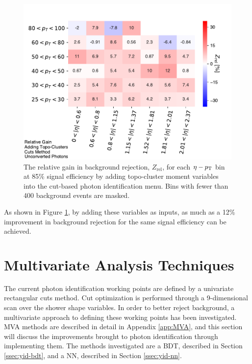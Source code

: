 \begin{figure}[!htb]
    \centering
    \includegraphics[width=.85\textwidth]{chapters/chapter4_photonID/images/gain_topoAdded_unconverted.pdf}
    \caption[The relative gain in background rejection, $Z_{\text{rel}}$, for each $\eta-\pt$ bin at 85\% signal efficiency by adding topo-cluster moment variables into the cut-based photon identification menu]{The relative gain in background rejection, $Z_{\text{rel}}$, for each $\eta-\pt$ bin at 85\% signal efficiency by adding topo-cluster moment variables into the cut-based photon identification menu. Bins with fewer than 400 background events are masked.}
    \label{fig:gain-topo-clusters-added-unconverted}
\end{figure}
As shown in Figure \ref{fig:gain-topo-clusters-added-unconverted}, by adding these variables as inputs, as much as a 12\% improvement in background rejection for the same signal efficiency can be achieved.

\section{Multivariate Analysis Techniques} \label{sec:mva-yid}

The current photon identification working points are defined by a univariate rectangular cuts method. Cut optimization is performed through a 9-dimensional scan over the shower shape variables. In order to better reject background, a multivariate approach to defining these working points has been investigated. \gls{MVA} methods are described in detail in Appendix \ref{app:MVA}, and this section will discuss the improvements brought to photon identification through implementing them. The methods investigated are a \gls{BDT}, described in Section \ref{ssec:yid-bdt}, and a \gls{NN}, described in Section \ref{ssec:yid-nn}.


